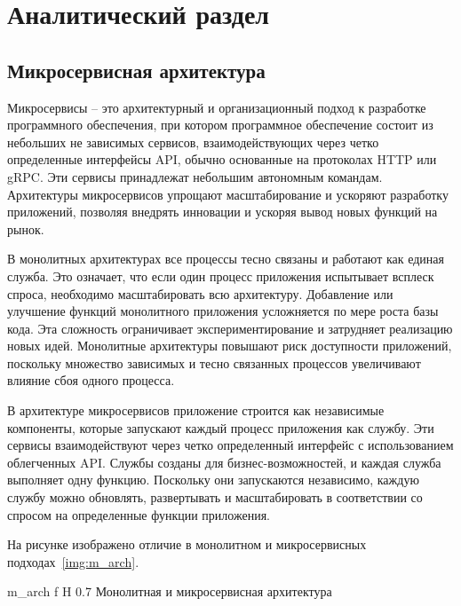 \chapter{Аналитический раздел}

\section{Микросервисная архитектура}

Микросервисы – это архитектурный и организационный подход к разработке программного обеспечения, при котором программное обеспечение состоит из небольших не зависимых сервисов, взаимодействующих через четко определенные интерфейсы API, обычно основанные на протоколах HTTP или gRPC. Эти сервисы принадлежат небольшим автономным командам.
Архитектуры микросервисов упрощают масштабирование и ускоряют разработку приложений, позволяя  внедрять инновации и ускоряя вывод новых функций на рынок.


В монолитных архитектурах все процессы тесно связаны и работают как единая служба. Это означает, что если один процесс приложения испытывает всплеск спроса, необходимо масштабировать всю архитектуру. Добавление или улучшение функций монолитного приложения усложняется по мере роста базы кода. Эта сложность ограничивает экспериментирование и затрудняет реализацию новых идей. Монолитные архитектуры повышают риск доступности приложений, поскольку множество зависимых и тесно связанных процессов увеличивают влияние сбоя одного процесса.

В архитектуре микросервисов приложение строится как независимые компоненты, которые запускают каждый процесс приложения как службу. Эти сервисы взаимодействуют через четко определенный интерфейс с использованием облегченных API. Службы созданы для бизнес-возможностей, и каждая служба выполняет одну функцию. Поскольку они запускаются независимо, каждую службу можно обновлять, развертывать и масштабировать в соответствии со спросом на определенные функции приложения.~\cite{march}

На рисунке изображено отличие в монолитном и микросервисных подходах~\ref{img:m_arch}.

    {m_arch}
    {f}
    {H}
    {0.7\textwidth}
    {Монолитная и микросервисная архитектура}


